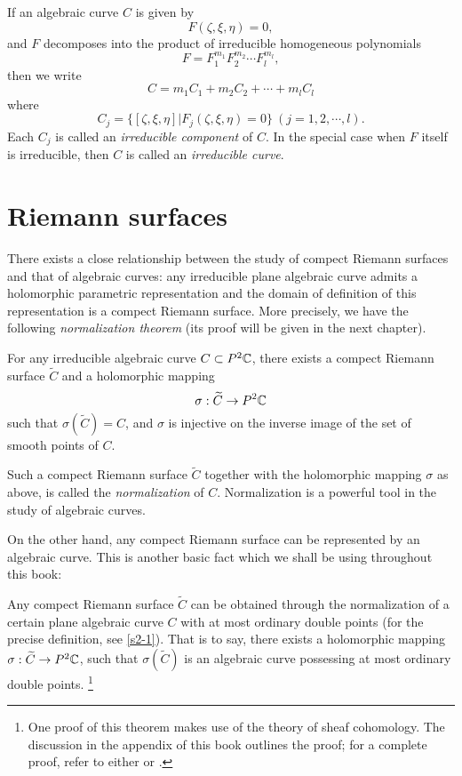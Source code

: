 If an algebraic curve $C$ is given by 
\[F(\zeta,\xi,\eta)=0, \]
and $F$ decomposes into the product of irreducible homogeneous polynomials 
\[F=F_1^{m_1}F_2^{m_2}\cdots F_l^{m_l}, \]
then we write 
\[C=m_1C_1+m_2C_2+\cdots+m_lC_l\]
where 
\[C_j=\{[\zeta,\xi,\eta]|F_j(\zeta,\xi,\eta)=0\}\ (j=1,2,\cdots,l). \]
Each $C_j$ is called an \textit{irreducible component} of $C$. In the special case when $F$ itself is irreducible, then $C$ is called an \textit{irreducible curve}. 

\section{Riemann surfaces}\label{s1-2}
There exists a close relationship between the study of compect Riemann surfaces and that of algebraic curves: any irreducible plane algebraic curve admits a holomorphic parametric representation and the domain of definition of this representation is a compect Riemann surface. More precisely, we have the following \textit{normalization theorem} (its proof will be given in the next chapter). 
\begin{theorem}
    For any irreducible algebraic curve $C\subset P^2\mathbb{C}$, there exists a compect Riemann surface $\widetilde{C}$ and a holomorphic mapping 
    \[\sigma:\widetilde{C}\to P^2\mathbb{C}\]
    such that $\sigma(\widetilde{C})=C$, and $\sigma$ is injective on the inverse image of the set of smooth points of $C$. 
\end{theorem}

Such a compect Riemann surface $\widetilde{C}$ together with the holomorphic mapping $\sigma$ as above, is called the \textit{normalization} of $C$. Normalization is a powerful tool in the study of algebraic curves. 

On the other hand, any compect Riemann surface can be represented by an algebraic curve. This is another basic fact which we shall be using throughout this book: 
\begin{theorem}
    Any compect Riemann surface $\widetilde{C}$ can be obtained through the normalization of a certain plane algebraic curve $C$ with at most ordinary double points (for the precise definition, see \autoref{s2-1}). That is to say, there exists a holomorphic mapping $\sigma:\widetilde{C}\to P^2\mathbb{C}$, such that $\sigma(\widetilde{C})$ is an algebraic curve possessing at most ordinary double points. \footnote{One proof of this theorem makes use of the theory of sheaf cohomology. The discussion in the appendix of this book outlines the proof; for a complete proof, refer to either \cite[chapter 2]{MR1288523} or \cite[section 5.21]{MR703513}.}
\end{theorem}

